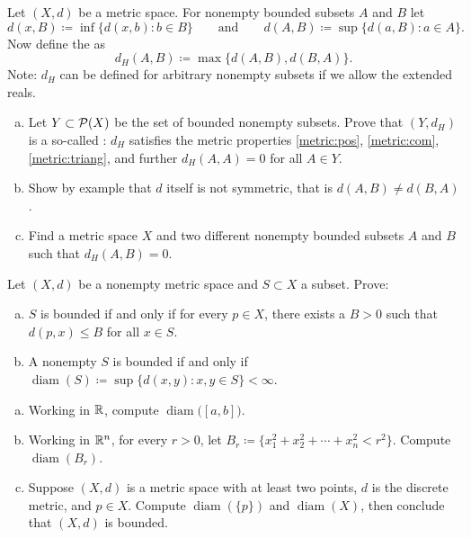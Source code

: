 \begin{exercise} \label{exercise:mshausdorffpseudo}
Let $(X,d)$ be a metric space.  For nonempty bounded subsets $A$ and $B$ let
\begin{equation*}
d(x,B) \coloneqq \inf \bigl\{ d(x,b) : b \in B \bigl\}
\qquad \text{and} \qquad
d(A,B) \coloneqq \sup \bigl\{ d(a,B) : a \in A \bigr\} .
\end{equation*}
Now define the \emph{} as
\begin{equation*}
d_H(A,B) \coloneqq \max \bigl\{ d(A,B) , d(B,A) \bigr\} .
\end{equation*}
Note: $d_H$ can be defined for arbitrary nonempty subsets if we allow the
extended reals.
\begin{enumerate}[a)]
\item
Let $Y \subset {\mathcal{P}}(X)$ be the set of bounded nonempty subsets.
Prove that
$(Y,d_H)$ is a so-called \emph{}:
$d_H$ satisfies the metric properties
\ref{metric:pos},
\ref{metric:com}, 
\ref{metric:triang}, and further
$d_H(A,A) = 0$ for all $A \in Y$. 
\item
Show by example that $d$ itself is not symmetric, that is $d(A,B) \not=
d(B,A)$.
\item
Find a metric space $X$ and two different
nonempty bounded subsets $A$ and $B$ such that $d_H(A,B) = 0$.
\end{enumerate}
\end{exercise}

\begin{exercise}
Let $(X,d)$ be a nonempty metric space and $S \subset X$ a subset.  Prove:
\begin{enumerate}[a)]
\item
$S$ is bounded if and only if
for every $p \in X$, there exists a $B > 0$ such that $d(p,x) \leq B$ for
all $x \in S$.
\item
A nonempty $S$ is bounded if and only if
$\operatorname{diam}(S) \coloneqq \sup \{ d(x,y) : x,y \in S \} < \infty$.
\end{enumerate}
\end{exercise}

\begin{samepage}
\begin{exercise}
\leavevmode
\begin{enumerate}[a)]
\item
Working in ${\mathbb{R}}$, compute $\operatorname{diam}\bigl([a,b]\bigr)$.
\item
Working in ${\mathbb{R}}^n$, for every $r > 0$, let $B_r \coloneqq \{ x_1^2+x_2^2+\cdots+x_n^2
< r^2 \}$.  Compute $\operatorname{diam}(B_r)$.
\item
Suppose $(X,d)$ is a metric space with at least two points,
$d$ is the discrete metric, and $p \in X$.
Compute
$\operatorname{diam}(\{ p \})$ and $\operatorname{diam}(X)$,
then conclude that $(X,d)$ is bounded.
\end{enumerate}
\end{exercise}
\end{samepage}

